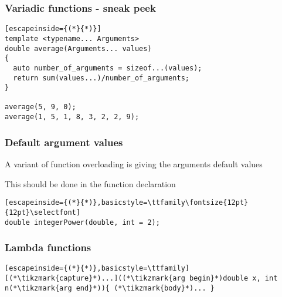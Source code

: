 \documentclass[14pt,a4paper,dvipsnames,usenames]{beamer}
\begin{document}
\begin{frame}[fragile]
  \frametitle{Variadic functions - sneak peek}

  \begin{lstlisting}[escapeinside={(*}{*)}]
template <typename... Arguments>
double average(Arguments... values)
{
  auto number_of_arguments = sizeof...(values);
  return sum(values...)/number_of_arguments;
}

average(5, 9, 0);
average(1, 5, 1, 8, 3, 2, 2, 9);
  \end{lstlisting}

  \CPPEleven

\end{frame}

\begin{frame}[fragile]
  \frametitle{Default argument values}

  A variant of function overloading is giving the arguments default values

  \vspace{1em}
  This should be done in the function declaration

  \vspace{1em}
  \begin{lstlisting}[escapeinside={(*}{*)},basicstyle=\ttfamily\fontsize{12pt}{12pt}\selectfont]
double integerPower(double, int = 2);
  \end{lstlisting}
  
\end{frame}

\begin{frame}[fragile]
  \frametitle{Lambda functions}

  \begin{lstlisting}[escapeinside={(*}{*)},basicstyle=\ttfamily]
[(*\tikzmark{capture}*)...]((*\tikzmark{arg begin}*)double x, int n(*\tikzmark{arg end}*)){ (*\tikzmark{body}*)... }
  \end{lstlisting}


  \CPPEleven
  
\end{frame}
\end{document}
